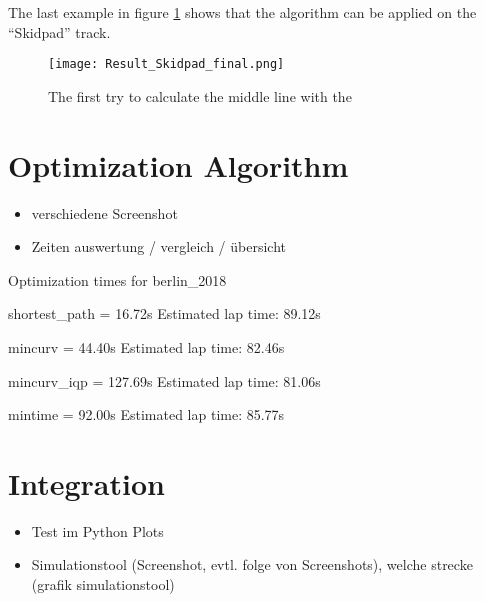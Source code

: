 The last example in figure \ref{fig:Result final middle line skidpad track} shows that the algorithm can be applied on the ``Skidpad'' track.
\begin{figure}[H]
    \centering
    \texttt{[image: Result\_Skidpad\_final.png]}
    \caption{The first try to calculate the middle line with the }
    \label{fig:Result final middle line skidpad track}
\end{figure}

\section{Optimization Algorithm}
\begin{itemize}
    \item verschiedene Screenshot
    \item Zeiten auswertung / vergleich / übersicht
\end{itemize}
Optimization times for berlin\_2018

shortest\_path = 16.72s
Estimated lap time: 89.12s

mincurv = 44.40s
Estimated lap time: 82.46s

mincurv\_iqp = 127.69s
Estimated lap time: 81.06s

mintime = 92.00s
Estimated lap time: 85.77s

\section{Integration}
\begin{itemize}
    \item Test im Python Plots
    \item Simulationstool (Screenshot, evtl. folge von Screenshots), welche strecke (grafik simulationstool)
\end{itemize}

